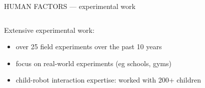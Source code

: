 \documentclass[xcolor=table]{beamer}
\begin{document}
{
\begin{frame}{HUMAN FACTORS --- experimental work}

    \begin{columns}
        \begin{column}{0.4\linewidth}

    Extensive experimental work:

    \begin{itemize}
        \item over 25 field experiments over the past 10 years
        \item focus on real-world experiments (eg schools, gyms) 
        \item child-robot interaction expertise: worked with 200+ children
    \end{itemize}

    \end{column}
        \begin{column}{0.6\linewidth}
    \end{column}
    \end{columns}
\end{frame}
}
\end{document}

